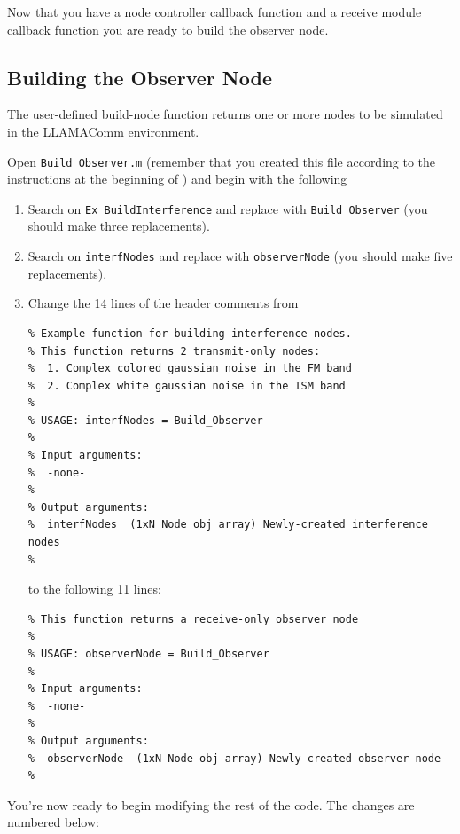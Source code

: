 Now that you have a node controller callback function and a receive module callback function you are ready to build the observer node.

\subsection{Building the Observer Node}
\label{sec:build_observer}

The user-defined build-node function returns one or more nodes to be simulated in the LLAMAComm environment.

Open \verb+Build_Observer.m+ (remember that you created this file according to the instructions at the beginning of ) and begin with the following
%
\begin{enumerate}
 \item Search on \verb+Ex_BuildInterference+ and replace with \verb+Build_Observer+ (you should make three replacements).

 \item Search on \verb+interfNodes+ and replace with \verb+observerNode+ (you should make five replacements).

 \item Change the 14 lines of the header comments from
%
\begin{lstlisting}[numbers=none]
% Function Build_Observer.m:
% Example function for building interference nodes.
% This function returns 2 transmit-only nodes:
%  1. Complex colored gaussian noise in the FM band
%  2. Complex white gaussian noise in the ISM band
%
% USAGE: interfNodes = Build_Observer
%
% Input arguments:
%  -none-
%
% Output arguments:
%  interfNodes  (1xN Node obj array) Newly-created interference nodes
%
\end{lstlisting}
%
to the following 11 lines:
%
\begin{lstlisting}[numbers=none]
% Function Build_Observer.m:
% This function returns a receive-only observer node
%
% USAGE: observerNode = Build_Observer
%
% Input arguments:
%  -none-
%
% Output arguments:
%  observerNode  (1xN Node obj array) Newly-created observer node
%
\end{lstlisting}
%
\end{enumerate}

You're now ready to begin modifying the rest of the code.  The changes are numbered below:

